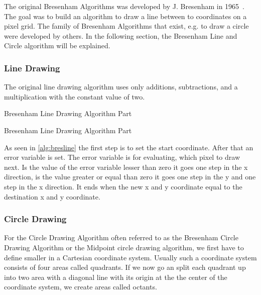The original Bresenham Algorithms was developed by J. Bresenham in 1965~\cite{Bresenham65Line}. The goal was to build an algorithm to draw a line between to coordinates on a pixel grid. The family of Bresenham Algorithms that exist, e.g. to draw a circle were developed by others. In the following section, the Bresenham Line and Circle algorithm will be explained.
\subsubsection*{Line Drawing}
The original line drawing algorithm uses only additions, subtractions, and a multiplication with the constant value of two.

\begin{algorithm}
	\caption{Bresenham Line Drawing Algorithm Part }
	\label{alg:bresline}
	\SetAlgoLined
\end{algorithm}
\begin{algorithm}
	\caption{Bresenham Line Drawing Algorithm Part }
	\SetAlgoVlined
\end{algorithm}

As seen in \cref{alg:bresline} the first step is to set the start coordinate. After that an error variable is set. The error variable is for evaluating, which pixel to draw next. Is the value of the error variable lesser than zero it goes one step in the x direction, is the value greater or equal than zero it goes one step in the y and one step in the x direction. It ends when the new x and y coordinate equal to the destination x and y coordinate.
 
\subsubsection*{Circle Drawing}
For the Circle Drawing Algorithm often referred to as the Bresenham Circle Drawing Algorithm or the Midpoint circle drawing algorithm, we first have to define smaller in a Cartesian coordinate system. Usually such a coordinate system consists of four areas called quadrants. If we now go an split each quadrant up into two area with a diagonal line with its origin at the the center of the coordinate system, we create areas called octants.

